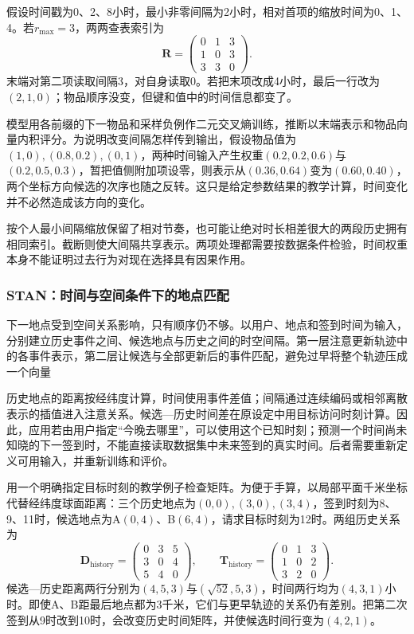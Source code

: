 假设时间戳为0、2、8小时，最小非零间隔为2小时，相对首项的缩放时间为0、1、4。若$r_{\max}=3$，两两查表索引为
\[
  \bm{R}=
  \begin{pmatrix}0&1&3\\1&0&3\\3&3&0\end{pmatrix}.
\]
末端对第二项读取间隔3，对自身读取0。若把末项改成4小时，最后一行改为$(2,1,0)$；物品顺序没变，但键和值中的时间信息都变了。

模型用各前缀的下一物品和采样负例作二元交叉熵训练，推断以末端表示和物品向量内积评分。为说明改变间隔怎样传到输出，假设物品值为$(1,0),(0.8,0.2),(0,1)$，两种时间输入产生权重$(0.2,0.2,0.6)$与$(0.2,0.5,0.3)$，暂把值侧附加项设零，则表示从$(0.36,0.64)$变为$(0.60,0.40)$，两个坐标方向候选的次序也随之反转。这只是给定参数结果的教学计算，时间变化并不必然造成该方向的变化。

按个人最小间隔缩放保留了相对节奏，也可能让绝对时长相差很大的两段历史拥有相同索引。截断则使大间隔共享表示。两项处理都需要按数据条件检验，时间权重本身不能证明过去行为对现在选择具有因果作用。

\subsubsection{STAN：时间与空间条件下的地点匹配}
\label{sec:rs-stan}

下一地点受到空间关系影响，只有顺序仍不够。以用户、地点和签到时间为输入，分别建立历史事件之间、候选地点与历史之间的时空间隔。第一层注意更新轨迹中的各事件表示，第二层让候选与全部更新后的事件匹配，避免过早将整个轨迹压成一个向量

历史地点的距离按经纬度计算，时间使用事件差值；间隔通过连续编码或相邻离散表示的插值进入注意关系。候选—历史时间差在原设定中用目标访问时刻计算。因此，应用若由用户指定“今晚去哪里”，可以使用这个已知时刻；预测一个时间尚未知晓的下一签到时，不能直接读取数据集中未来签到的真实时间。后者需要重新定义可用输入，并重新训练和评价。

用一个明确指定目标时刻的教学例子检查矩阵。为便于手算，以局部平面千米坐标代替经纬度球面距离：三个历史地点为$(0,0),(3,0),(3,4)$，签到时刻为8、9、11时，候选地点为A$(0,4)$、B$(6,4)$，请求目标时刻为12时。两组历史关系为
\[
  \bm{D}_{\mathrm{history}}=
  \begin{pmatrix}0&3&5\\3&0&4\\5&4&0\end{pmatrix},\qquad
  \bm{T}_{\mathrm{history}}=
  \begin{pmatrix}0&1&3\\1&0&2\\3&2&0\end{pmatrix}.
\]
候选—历史距离两行分别为$(4,5,3)$与$(\sqrt{52},5,3)$，时间两行均为$(4,3,1)$小时。即使A、B距最后地点都为3千米，它们与更早轨迹的关系仍有差别。把第二次签到从9时改到10时，会改变历史时间矩阵，并使候选时间行变为$(4,2,1)$。

